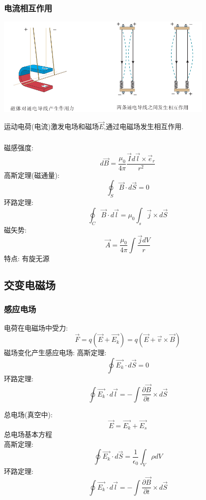 \begin{frame}
      \frametitle{电流相互作用}
        \begin{center}
             \includegraphics[width=0.8\textwidth]{figs/2022-04-04-11-09-40.png}
        \end{center}
        运动电荷(电流)激发电场和磁场$\vec{E}$,通过电磁场发生相互作用.  
\end{frame}

\begin{frame}
    \frametitle{}    
    磁感强度: \[d\vec{B}=\frac{\mu_0}{4\pi}\frac{\vec{I}d \vec{l}\times \vec{e}_r}{r^2}\]
    高斯定理(磁通量):\[ \oint_S \vec{B}\cdot d \vec{S} = 0 \] 
    环路定理: \[ \oint_C \vec{B}\cdot d \vec{l} = \mu_0 \int_s \vec{j}\times d \vec{S} \]
    磁矢势: \[\vec{A}=\frac{\mu_0}{4\pi} \int \frac{\vec{j}dV}  {r}\]
    特点: 有旋无源
\end{frame}

\subsection{交变电磁场}

\begin{frame}
    \frametitle{感应电场}
    电荷在电磁场中受力: \[ \vec{F}=q(\vec{E}+\vec{E_k}) = q(\vec{E}+\vec{v}\times \vec{B}) \]
    磁场变化产生感应电场:
    高斯定理:\[ \oint \vec{E_k}\cdot d \vec{S} = 0 \] 
    环路定理: \[ \oint \vec{E_k}\cdot d \vec{l} = - \int \frac{\partial \vec{B} }{\partial t} \times d \vec{S}\]
\end{frame}

\begin{frame}
    总电场(真空中): \[\vec{E}=\vec{E_k}+\vec{E_s} \] 
    总电场基本方程 \\ 
    高斯定理:\[ \oint \vec{E_k}\cdot d \vec{S} = \frac{1}{\epsilon_0}\int_V \rho  d V \]  
    环路定理: \[ \oint \vec{E_k}\cdot d \vec{l} = - \int \frac{\partial \vec{B} }{\partial t} \times d \vec{S}\]
\end{frame}

